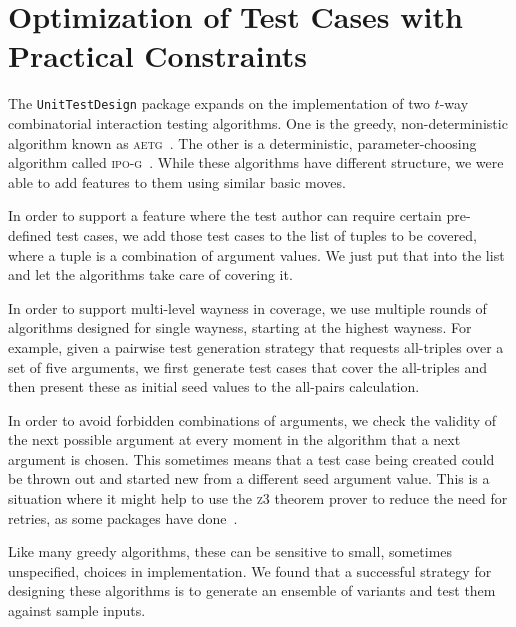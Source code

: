 \documentclass{juliacon}
\newcommand{\utd}{\texttt{UnitTestDesign}\xspace}
\begin{document}
\section{Optimization of Test Cases with Practical Constraints}\label{sec:implementation}

The \utd package expands on the implementation of two $t$-way combinatorial interaction testing algorithms. One is the greedy, non-deterministic algorithm known as \textsc{aetg}~\cite{Cohen1997-lb}. The other is a deterministic, parameter-choosing algorithm called \textsc{ipo-g}~\cite{Lei2008-xt}. While these algorithms have different structure, we were able to add features to them using similar basic moves.

\vskip 6pt
In order to support a feature where the test author can require certain pre-defined test cases, we add those test cases to the list of tuples to be covered, where a tuple is a combination of argument values. We just put that into the list and let the algorithms take care of covering it.

\vskip 6pt
In order to support multi-level wayness in coverage, we use multiple rounds of algorithms designed for single wayness, starting at the highest wayness. For example, given a pairwise test generation strategy that requests all-triples over a set of five arguments, we first generate test cases that cover the all-triples and then present these as initial seed values to the all-pairs calculation.

\vskip 6pt
In order to avoid forbidden combinations of arguments, we check the validity of the next possible argument at every moment in the algorithm that a next argument is chosen. This sometimes means that a test case being created could be thrown out and started new from a different seed argument value. This is a situation where it might help to use the \textsc{z3} theorem prover to reduce the need for retries, as some packages have done~\cite{Nie2011-yl}.

\vskip 6pt
Like many greedy algorithms, these can be sensitive to small, sometimes unspecified, choices in implementation. We found that a successful strategy for designing these algorithms is to generate an ensemble of variants and test them against sample inputs.
\end{document}
